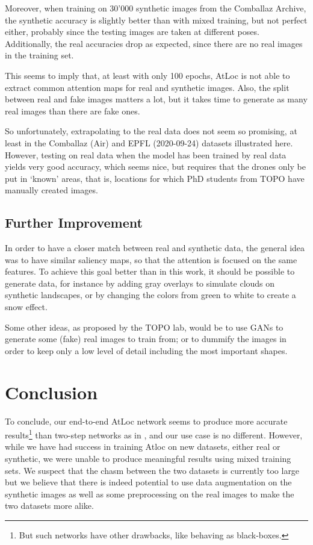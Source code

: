\documentclass[10pt,conference,compsocconf]{IEEEtran}
\begin{document}
Moreover, when training on 30'000 synthetic images from the Comballaz Archive, the synthetic accuracy is slightly better than with mixed training, but not perfect either, probably since the testing images are taken at different poses. Additionally, the real accuracies drop as expected, since there are no real images in the training set.

This seems to imply that, at least with only 100 epochs, AtLoc is not able to extract common attention maps for real and synthetic images. Also, the split between real and fake images matters a lot, but it takes time to generate as many real images than there are fake ones. 

So unfortunately, extrapolating to the real data does not seem so promising, at least in the Comballaz (Air) and EPFL (2020-09-24) datasets illustrated here. However, testing on real data when the model has been trained by real data yields very good accuracy, which seems nice, but requires that the drones only be put in `known' areas, that is, locations for which PhD students from TOPO have manually created images.




\subsection{Further Improvement}

In order to have a closer match between real and synthetic data, the general idea was to have similar saliency maps, so that the attention is focused on the same features. To achieve this goal better than in this work, it should be possible to generate data, for instance by adding gray overlays to simulate clouds on synthetic landscapes, or by changing the colors from green to white to create a snow effect.

Some other ideas, as proposed by the TOPO lab, would be to use GANs to generate some (fake) real images to train from; or to dummify the images in order to keep only a low level of detail including the most important shapes.

\section{Conclusion}
To conclude, our end-to-end AtLoc network seems to produce more accurate results\footnote{But such networks have other drawbacks, like behaving as black-boxes.} than two-step networks as in \cite{yan2020oneshot}, and our use case is no different. However, while we have had success in training Atloc on new datasets, either real or synthetic, we were unable to produce meaningful results using mixed training sets. We suspect that the chasm between the two datasets is currently too large but we believe that there is indeed potential to use data augmentation on the synthetic images as well as some preprocessing on the real images to make the two datasets more alike.
\end{document}

